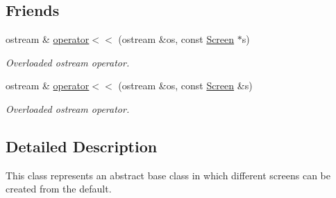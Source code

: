 \subsection*{Friends}
\begin{DoxyCompactItemize}
\item 
ostream \& \hyperlink{classScreen_a9d1583ec176b804e06d7c6d2a8bf3bcd}{operator$<$$<$} (ostream \&os, const \hyperlink{classScreen}{Screen} $\ast$s)
\begin{DoxyCompactList}\small\item\em Overloaded ostream operator. \end{DoxyCompactList}\item 
ostream \& \hyperlink{classScreen_adb701ccee14124fb66506086b5a34199}{operator$<$$<$} (ostream \&os, const \hyperlink{classScreen}{Screen} \&s)
\begin{DoxyCompactList}\small\item\em Overloaded ostream operator. \end{DoxyCompactList}\end{DoxyCompactItemize}


\subsection{Detailed Description}
This class represents an abstract base class in which different screens can be created from the default. 

